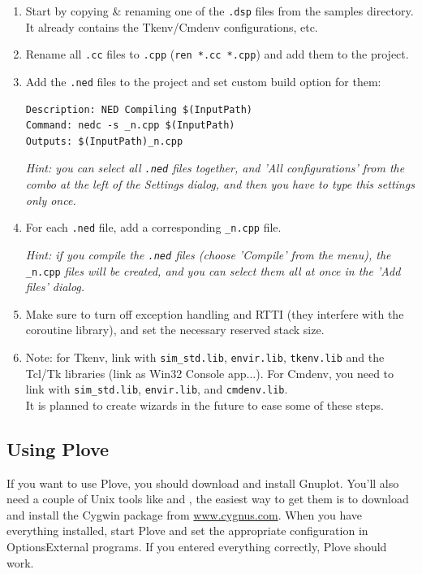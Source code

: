 \begin{enumerate}
\item{Start by copying \& renaming one of the \texttt{.dsp} files from
    the samples directory. It already contains the Tkenv/Cmdenv
    configurations, etc.}
\item{ Rename all \texttt{.cc} files to \texttt{.cpp} (\texttt{ren
      *.cc *.cpp}) and add them to the project.}
\item{Add the \texttt{.ned} files to the project and set custom build
    option for them:

\begin{Verbatim}
Description: NED Compiling $(InputPath) 
Command: nedc -s _n.cpp $(InputPath)
Outputs: $(InputPath)_n.cpp
\end{Verbatim}


\textit{Hint: you can select all \texttt{.ned} files together, and
  'All configurations' from the combo at the left of the Settings
  dialog, and then you have to type this settings only once.}}


\item{For each \texttt{.ned} file, add a corresponding
    \texttt{\_n.cpp} file.
    
    \textit{Hint: if you compile the \texttt{.ned} files (choose
      'Compile' from the menu), the} \texttt{\_n.cpp} \textit{files will be
      created, and you can select them all at once in the 'Add files'
      dialog.}}
\item{Make sure to turn off exception handling and RTTI (they interfere with the
    coroutine library), and set the necessary reserved stack size.}
\item{Note: for Tkenv, link with \texttt{sim\_std.lib},
    \texttt{envir.lib}, \texttt{tkenv.lib} and the Tcl/Tk libraries
    (link as Win32 Console app...). For Cmdenv, you need to link with \texttt{sim\_std.lib}, \texttt{envir.lib}, and \texttt{cmdenv.lib}.\\
    It is planned to create wizards in the future to ease some of
    these steps.}
\end{enumerate}




\subsection{Using Plove}

If you want to use Plove, you should download and install
Gnuplot.  You'll also need a couple of Unix tools like
 and , the easiest way to get them is to
download and install the Cygwin package from
\href{http://www.cygnus.com}{www.cygnus.com}.  When you have
everything installed, start Plove and set the appropriate
configuration in Options{\textbar}External programs. If you entered
everything correctly, Plove should work.


